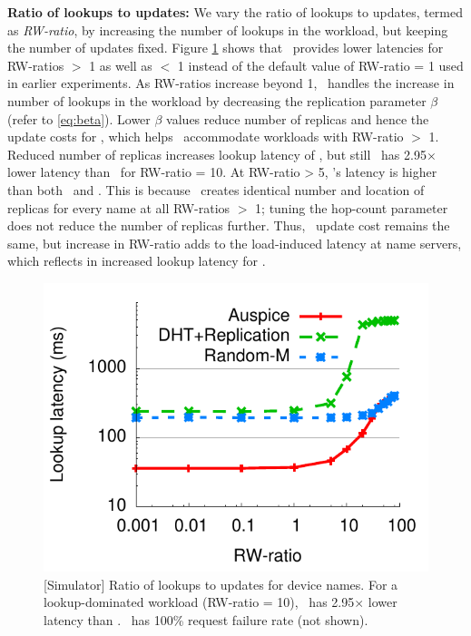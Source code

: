 

\textbf{Ratio of lookups to updates:} 
We vary the ratio of lookups to updates, termed as \emph{RW-ratio}, by increasing the number of lookups in the workload, but keeping the number of updates fixed. Figure \ref{fig:readwriteratio} shows that \auspice\ provides lower latencies for RW-ratios $>$ 1 as well as $<$ 1 instead of the default value of RW-ratio = 1 used in earlier experiments. As RW-ratios increase beyond 1,  \auspice\ handles the increase in number of lookups in the workload by decreasing the replication parameter $\beta$ (refer to \ref{eq:beta}). Lower $\beta$ values reduce number of replicas and hence the update costs for \auspice, which helps \auspice\ accommodate workloads with  RW-ratio $>$ 1. Reduced number of replicas increases  lookup latency of \auspice, but still \auspice\  has 2.95$\times$ lower latency than \staticthree\  for RW-ratio = 10. At RW-ratio > 5, \codons's latency is higher than both \staticthree\ and \auspice. This is because  \codons\ creates identical number and location of replicas for every name at all RW-ratios $>$ 1; tuning the hop-count parameter does not reduce the number of replicas further. Thus, \codons\ update cost remains the same, but increase in RW-ratio adds to the load-induced latency at name servers, which reflects in increased lookup latency for \codons.


\begin{figure}
\centering
\includegraphics[scale=0.5]{graph/readwriteratio.pdf}
\vspace{-0.1in}
\caption{[Simulator] Ratio of lookups to updates for device names. For a lookup-dominated workload (RW-ratio = 10), \auspice\ has 2.95$\times$ lower latency than \staticthree.  \replicateall\ has 100\% request failure rate (not shown).}
\label{fig:readwriteratio}
\vspace{-0.1in}
\end{figure}



